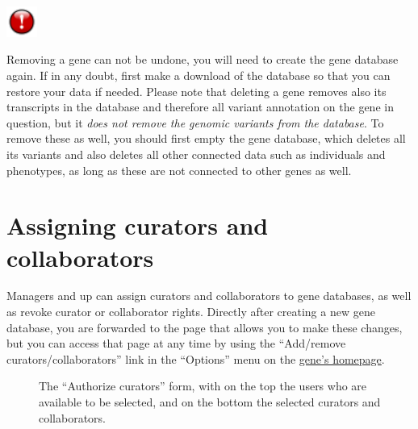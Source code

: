 \documentclass[a4paper,oneside,openany,12pt]{memoir}
\newlength{\infoboxlength}
\newlength{\infoboxinnerlength}
\newenvironment{warntable}
  {\begin{lrbox}{\infobox}%
    \begin{minipage}[t]{1.5cm}
      \centering
      \vspace{0pt}
      \includegraphics[width=1cm,height=1cm]{lovd_warning.png}
    \end{minipage}
   \begin{minipage}[t]{\infoboxlength}\vspace{5pt}\begin{minipage}{\infoboxinnerlength}}
  {\vspace{6pt}\end{minipage}\end{minipage}\end{lrbox}%
   \begin{center}
   \fcolorbox{black}{LOVDlight}{\usebox{\infobox}}
   \end{center}}
\renewenvironment{leftbar}[1][\hsize]
{%
    \def\FrameCommand
    {%
        {\color{LOVDdark}\vrule width 3pt \hspace{5pt}}%
        \colorbox{LOVDlight}%
    }%
    \MakeFramed{\hsize#1\advance\hsize-\width\FrameRestore}%
}
{\endMakeFramed}
\begin{document}
\begin{warntable}
Removing a gene can not be undone, you will need to create the gene database again.
If in any doubt, first make a download of the database so that you can restore your data if needed.
Please note that deleting a gene removes also its transcripts in the database and therefore
 all variant annotation on the gene in question, but it \emph{does not remove the genomic variants from the database}.
To remove these as well, you should first empty the gene database, which deletes all its variants and also deletes
 all other connected data such as individuals and phenotypes, as long as these are not connected to other genes as well.
\end{warntable}





\hypertarget{s_gene_assign_curators}{}
\section{Assigning curators and collaborators}
Managers and up can assign curators and collaborators to gene databases, as well as revoke curator or collaborator rights.
Directly after creating a new gene database, you are forwarded to the page that allows you to make these changes,
 but you can access that page at any time by using the ``Add/remove curators/collaborators'' link in the
 ``Options'' menu on the \hyperlink{s_gene_homepage}{gene's homepage}.

\begin{figure}[h]
  \begin{shaded}
  \caption{%
    The ``Authorize curators'' form, with on the top the users who are available to be selected, and on the bottom the selected curators and collaborators.}
  \label{fig:c05s05_screenshot_authorize_curators}
  \end{shaded}
\end{figure}
\end{document}
